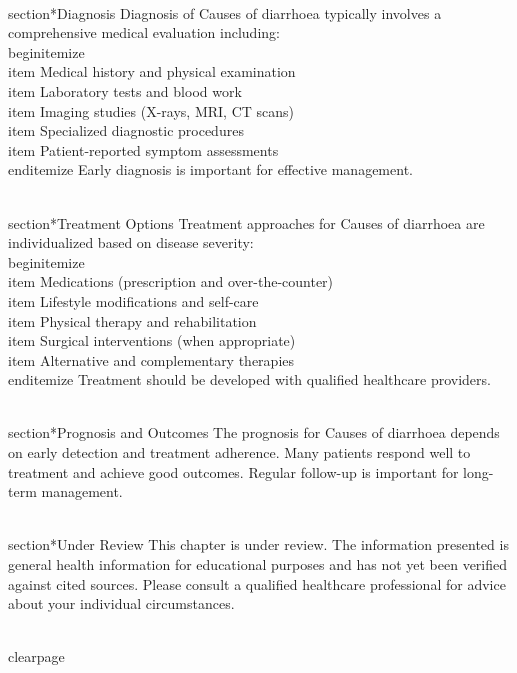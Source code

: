 \\section*{Diagnosis}
Diagnosis of Causes of diarrhoea typically involves a comprehensive medical evaluation including:
\\begin{itemize}
  \\item Medical history and physical examination
  \\item Laboratory tests and blood work
  \\item Imaging studies (X-rays, MRI, CT scans)
  \\item Specialized diagnostic procedures
  \\item Patient-reported symptom assessments
\\end{itemize}
Early diagnosis is important for effective management.

\\section*{Treatment Options}
Treatment approaches for Causes of diarrhoea are individualized based on disease severity:
\\begin{itemize}
  \\item Medications (prescription and over-the-counter)
  \\item Lifestyle modifications and self-care
  \\item Physical therapy and rehabilitation
  \\item Surgical interventions (when appropriate)
  \\item Alternative and complementary therapies
\\end{itemize}
Treatment should be developed with qualified healthcare providers.

\\section*{Prognosis and Outcomes}
The prognosis for Causes of diarrhoea depends on early detection and treatment adherence. Many patients respond well to treatment and achieve good outcomes. Regular follow-up is important for long-term management.

\\section*{Under Review}
This chapter is under review. The information presented is general health information for educational purposes and has not yet been verified against cited sources. Please consult a qualified healthcare professional for advice about your individual circumstances.

\\clearpage
